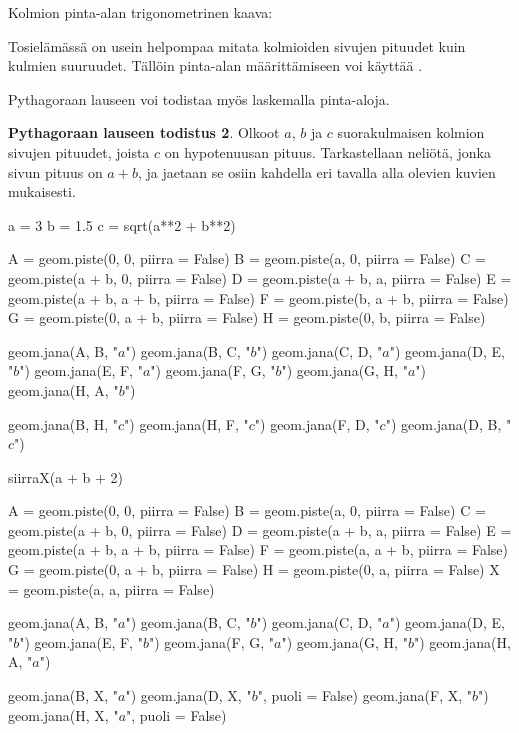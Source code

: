 
Kolmion pinta-alan trigonometrinen kaava:


Tosielämässä on usein helpompaa mitata kolmioiden sivujen pituudet kuin kulmien suuruudet. Tällöin pinta-alan määrittämiseen voi käyttää .


Pythagoraan lauseen voi todistaa myös laskemalla pinta-aloja.

\textbf{Pythagoraan lauseen todistus 2}. Olkoot $a$, $b$ ja $c$ suorakulmaisen kolmion
sivujen pituudet, joista $c$ on hypotenuusan pituus. Tarkastellaan neliötä, jonka sivun
pituus on $a+b$, ja jaetaan se osiin kahdella eri tavalla alla olevien kuvien mukaisesti.

\begin{kuva}
a = 3
b = 1.5
c = sqrt(a**2 + b**2)

A = geom.piste(0, 0, piirra = False)
B = geom.piste(a, 0, piirra = False)
C = geom.piste(a + b, 0, piirra = False)
D = geom.piste(a + b, a, piirra = False)
E = geom.piste(a + b, a + b, piirra = False)
F = geom.piste(b, a + b, piirra = False)
G = geom.piste(0, a + b, piirra = False)
H = geom.piste(0, b, piirra = False)

geom.jana(A, B, "$a$")
geom.jana(B, C, "$b$")
geom.jana(C, D, "$a$")
geom.jana(D, E, "$b$")
geom.jana(E, F, "$a$")
geom.jana(F, G, "$b$")
geom.jana(G, H, "$a$")
geom.jana(H, A, "$b$")

geom.jana(B, H, "$c$")
geom.jana(H, F, "$c$")
geom.jana(F, D, "$c$")
geom.jana(D, B, "$c$")

siirraX(a + b + 2)

A = geom.piste(0, 0, piirra = False)
B = geom.piste(a, 0, piirra = False)
C = geom.piste(a + b, 0, piirra = False)
D = geom.piste(a + b, a, piirra = False)
E = geom.piste(a + b, a + b, piirra = False)
F = geom.piste(a, a + b, piirra = False)
G = geom.piste(0, a + b, piirra = False)
H = geom.piste(0, a, piirra = False)
X = geom.piste(a, a, piirra = False)

geom.jana(A, B, "$a$")
geom.jana(B, C, "$b$")
geom.jana(C, D, "$a$")
geom.jana(D, E, "$b$")
geom.jana(E, F, "$b$")
geom.jana(F, G, "$a$")
geom.jana(G, H, "$b$")
geom.jana(H, A, "$a$")

geom.jana(B, X, "$a$")
geom.jana(D, X, "$b$", puoli = False)
geom.jana(F, X, "$b$")
geom.jana(H, X, "$a$", puoli = False)
\end{kuva}

